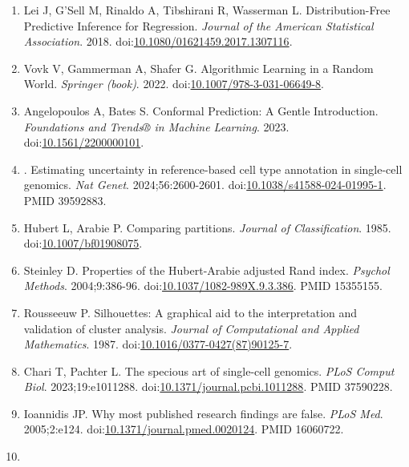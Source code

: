 \documentclass{article}
\begin{document}
\begin{enumerate}
  Guo C, Pleiss G, Sun Y, Weinberger KQ. On Calibration of Modern Neural
  Networks. \emph{Proceedings of ICML 2017 (PMLR 70); arXiv:1706.04599}.
  2017.
  doi:\href{https://doi.org/10.48550/arXiv.1706.04599}{10.48550/arXiv.1706.04599}.
\item
  Lei J, G'Sell M, Rinaldo A, Tibshirani R, Wasserman L.
  Distribution-Free Predictive Inference for Regression. \emph{Journal
  of the American Statistical Association}. 2018.
  doi:\href{https://doi.org/10.1080/01621459.2017.1307116}{10.1080/01621459.2017.1307116}.
\item
  Vovk V, Gammerman A, Shafer G. Algorithmic Learning in a Random World.
  \emph{Springer (book)}. 2022.
  doi:\href{https://doi.org/10.1007/978-3-031-06649-8}{10.1007/978-3-031-06649-8}.
\item
  Angelopoulos A, Bates S. Conformal Prediction: A Gentle Introduction.
  \emph{Foundations and Trends® in Machine Learning}. 2023.
  doi:\href{https://doi.org/10.1561/2200000101}{10.1561/2200000101}.
\item
  . Estimating uncertainty in reference-based cell type annotation in
  single-cell genomics. \emph{Nat Genet}. 2024;56:2600-2601.
  doi:\href{https://doi.org/10.1038/s41588-024-01995-1}{10.1038/s41588-024-01995-1}.
  PMID 39592883.
\item
  Hubert L, Arabie P. Comparing partitions. \emph{Journal of
  Classification}. 1985.
  doi:\href{https://doi.org/10.1007/bf01908075}{10.1007/bf01908075}.
\item
  Steinley D. Properties of the Hubert-Arabie adjusted Rand index.
  \emph{Psychol Methods}. 2004;9:386-96.
  doi:\href{https://doi.org/10.1037/1082-989X.9.3.386}{10.1037/1082-989X.9.3.386}.
  PMID 15355155.
\item
  Rousseeuw P. Silhouettes: A graphical aid to the interpretation and
  validation of cluster analysis. \emph{Journal of Computational and
  Applied Mathematics}. 1987.
  doi:\href{https://doi.org/10.1016/0377-0427(87)90125-7}{10.1016/0377-0427(87)90125-7}.
\item
  Chari T, Pachter L. The specious art of single-cell genomics.
  \emph{PLoS Comput Biol}. 2023;19:e1011288.
  doi:\href{https://doi.org/10.1371/journal.pcbi.1011288}{10.1371/journal.pcbi.1011288}.
  PMID 37590228.
\item
  Ioannidis JP. Why most published research findings are false.
  \emph{PLoS Med}. 2005;2:e124.
  doi:\href{https://doi.org/10.1371/journal.pmed.0020124}{10.1371/journal.pmed.0020124}.
  PMID 16060722.
\item

\end{enumerate}
\end{document}
